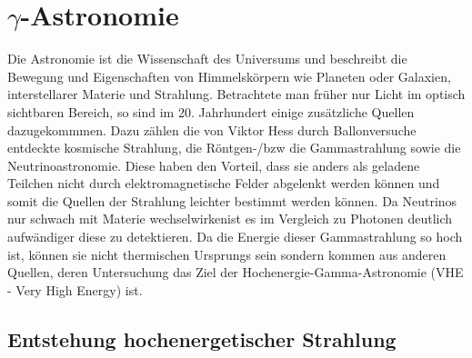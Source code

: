 \chapter{$\gamma$-Astronomie} 
Die Astronomie ist die Wissenschaft des Universums und beschreibt die Bewegung und Eigenschaften von Himmelskörpern wie Planeten oder Galaxien, interstellarer Materie und Strahlung. Betrachtete man früher nur Licht im optisch sichtbaren Bereich, so sind im 20. Jahrhundert einige zusätzliche Quellen dazugekommmen. Dazu zählen die von Viktor Hess durch Ballonversuche entdeckte kosmische Strahlung, die Röntgen-/bzw die Gammastrahlung sowie die Neutrinoastronomie.
Diese haben den Vorteil, dass sie anders als geladene Teilchen nicht durch elektromagnetische Felder abgelenkt werden können und somit die Quellen der Strahlung leichter bestimmt werden können. Da Neutrinos nur schwach mit Materie wechselwirkenist es im Vergleich zu Photonen deutlich aufwändiger diese zu detektieren.
Da die Energie dieser Gammastrahlung so hoch ist, können sie nicht thermischen Ursprungs sein sondern kommen aus anderen Quellen, deren Untersuchung das Ziel der Hochenergie-Gamma-Astronomie (VHE - Very High Energy) ist.

\section{Entstehung hochenergetischer Strahlung}


